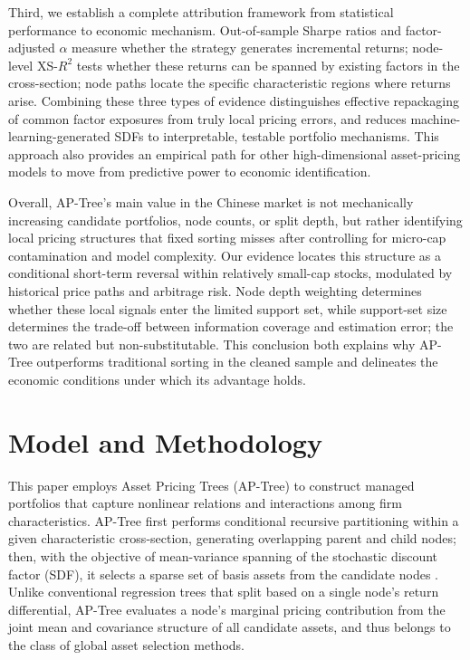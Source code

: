 \documentclass[12pt]{article}
\begin{document}
Third, we establish a complete attribution framework from statistical performance to economic mechanism. Out-of-sample Sharpe ratios and factor-adjusted \(\alpha\) measure whether the strategy generates incremental returns; node-level XS-\(R^2\) tests whether these returns can be spanned by existing factors in the cross-section; node paths locate the specific characteristic regions where returns arise. Combining these three types of evidence distinguishes effective repackaging of common factor exposures from truly local pricing errors, and reduces machine-learning-generated SDFs to interpretable, testable portfolio mechanisms. This approach also provides an empirical path for other high-dimensional asset-pricing models to move from predictive power to economic identification.

Overall, AP-Tree's main value in the Chinese market is not mechanically increasing candidate portfolios, node counts, or split depth, but rather identifying local pricing structures that fixed sorting misses after controlling for micro-cap contamination and model complexity. Our evidence locates this structure as a conditional short-term reversal within relatively small-cap stocks, modulated by historical price paths and arbitrage risk. Node depth weighting determines whether these local signals enter the limited support set, while support-set size determines the trade-off between information coverage and estimation error; the two are related but non-substitutable. This conclusion both explains why AP-Tree outperforms traditional sorting in the cleaned sample and delineates the economic conditions under which its advantage holds.

\clearpage

\section{Model and Methodology}
\label{sec:method}

This paper employs Asset Pricing Trees (AP-Tree) to construct managed portfolios that capture nonlinear relations and interactions among firm characteristics. AP-Tree first performs conditional recursive partitioning within a given characteristic cross-section, generating overlapping parent and child nodes; then, with the objective of mean-variance spanning of the stochastic discount factor (SDF), it selects a sparse set of basis assets from the candidate nodes \cite{ref3}. Unlike conventional regression trees that split based on a single node's return differential, AP-Tree evaluates a node's marginal pricing contribution from the joint mean and covariance structure of all candidate assets, and thus belongs to the class of global asset selection methods.
\end{document}

